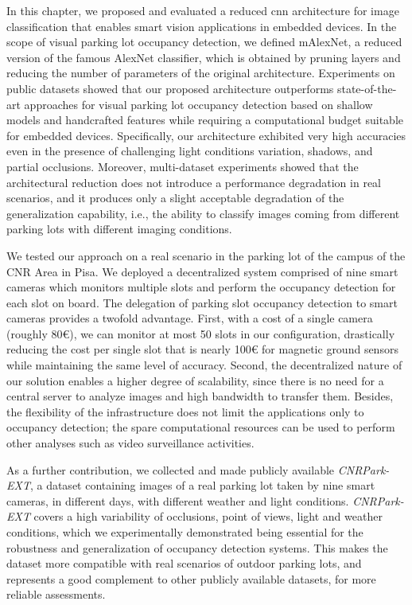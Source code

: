 In this chapter, we proposed and evaluated a reduced \acrlong{cnn} architecture for image classification that enables smart vision applications in embedded devices.
In the scope of visual parking lot occupancy detection, we defined mAlexNet, a reduced version of the famous AlexNet classifier, which is obtained by pruning layers and reducing the number of parameters of the original architecture.
Experiments on public datasets showed that our proposed architecture outperforms state-of-the-art approaches for visual parking lot occupancy detection based on shallow models and handcrafted features while requiring a computational budget suitable for embedded devices.
Specifically, our architecture exhibited very high accuracies even in the presence of challenging light conditions variation, shadows, and partial occlusions.
Moreover, multi-dataset experiments showed that the architectural reduction does not introduce a performance degradation in real scenarios, and it produces only a slight acceptable degradation of the generalization capability, i.e., the ability to classify images coming from different parking lots with different imaging conditions.

We tested our approach on a real scenario in the parking lot of the campus of the CNR Area in Pisa.
We deployed a decentralized system comprised of nine smart cameras which monitors multiple slots and perform the occupancy detection for each slot on board.
The delegation of parking slot occupancy detection to smart cameras provides a twofold advantage.
First, with a cost of a single camera (roughly 80\euro), we can monitor at most 50 slots in our configuration, drastically reducing the cost per single slot that is nearly 100\euro{} for magnetic ground sensors while maintaining the same level of accuracy.
Second, the decentralized nature of our solution enables a higher degree of scalability, since there is no need for a central server to analyze images and high bandwidth to transfer them.
Besides, the flexibility of the infrastructure does not limit the applications only to occupancy detection;
the spare computational resources can be used to perform other analyses such as video surveillance activities.

As a further contribution, we collected and made publicly available \emph{CNRPark-EXT}, a dataset containing images of a real parking lot taken by nine smart cameras, in different days, with different weather and light conditions.
\emph{CNRPark-EXT} covers a high variability of occlusions, point of views, light and weather conditions, which we experimentally demonstrated being essential for the robustness and generalization of occupancy detection systems.
This makes the dataset more compatible with real scenarios of outdoor parking lots, and represents a good complement to other publicly available datasets, for more reliable assessments.

